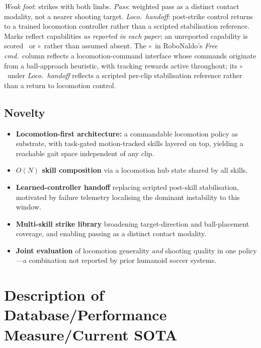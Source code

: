 \documentclass{article}
\newcommand{\no}{\textcolor{black!35}{\ding{55}}}
\newcommand{\partialmark}{\textcolor{black!60}{$\circ$}}
\begin{document}
\begin{table}[H]
{\emph{Weak foot}: strikes with both limbs.
\emph{Pass}: weighted pass as a distinct contact modality, not a nearer shooting target.
\emph{Loco.\ handoff}: post-strike control returns to a trained locomotion controller rather than a scripted stabilisation reference.
Marks reflect capabilities \emph{as reported in each paper}; an unreported capability is scored \no\ or \partialmark\ rather than assumed absent. The \partialmark\ in RoboNaldo's \emph{Free cmd.}\ column reflects a locomotion-command interface whose commands originate from a ball-approach heuristic, with tracking rewards active throughout; its \partialmark\ under \emph{Loco.\ handoff} reflects a scripted per-clip stabilisation reference rather than a return to locomotion control.}
\label{tab:capabilities}
\end{table}

\subsection*{Novelty}
\begin{itemize}
  \item \textbf{Locomotion-first architecture:} a commandable locomotion policy as substrate, with task-gated motion-tracked skills layered on top, yielding a reachable gait space independent of any clip.
  \item \textbf{$O(N)$ skill composition} via a locomotion hub state shared by all skills.
  \item \textbf{Learned-controller handoff} replacing scripted post-skill stabilisation, motivated by failure telemetry localising the dominant instability to this window.
  \item \textbf{Multi-skill strike library} broadening target-direction and ball-placement coverage, and enabling passing as a distinct contact modality.
  \item \textbf{Joint evaluation} of locomotion generality \emph{and} shooting quality in one policy---a combination not reported by prior humanoid soccer systems.
\end{itemize}

\section{Description of Database/Performance Measure/Current SOTA}
\end{document}
